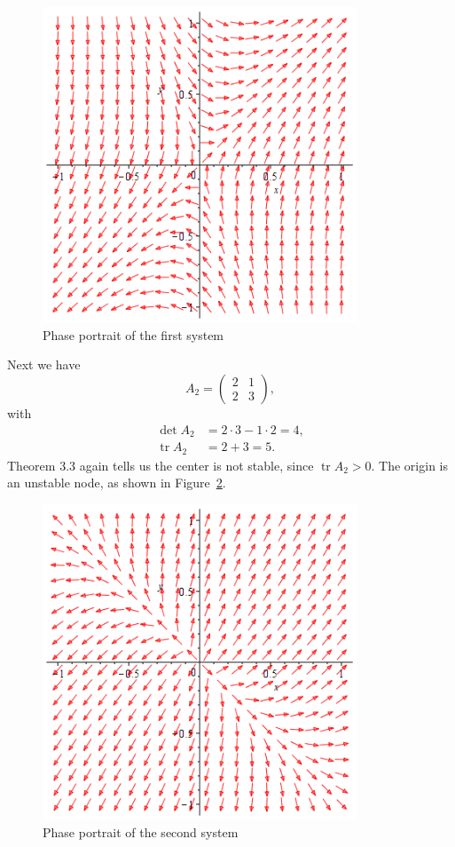 \documentclass{article}
\DeclareMathOperator{\tr}{tr}
\begin{document}
\begin{figure}[!ht]
    \includegraphics[width=3.7in]{q397a}
    \centering
    \caption{Phase portrait of the first system}
    \label{fig:397-a}
\end{figure}

Next we have
%
\begin{equation*}
    A_2 =
    \begin{pmatrix}
        2 & 1 \\
        2 & 3
    \end{pmatrix}
    ,
\end{equation*}
%
with
%
\begin{align*}
    \det A_2 &= 2 \cdot 3 - 1 \cdot 2 = 4, \\
    \tr A_2 &= 2 + 3 = 5
    .
\end{align*}
%
Theorem 3.3 again tells us the center is not stable, since
$\tr A_2 > 0$. The origin is an unstable node, as shown in
Figure~\ref{fig:397-b}.

\begin{figure}[!ht]
    \includegraphics[width=3.7in]{q397b}
    \centering
    \caption{Phase portrait of the second system}
    \label{fig:397-b}
\end{figure}
\end{document}
